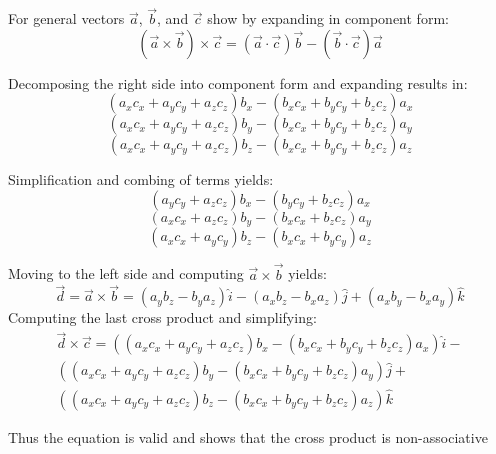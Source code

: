 For general vectors $\vec{a}$, $\vec{b}$, and $\vec{c}$ show by expanding in component form:
\begin{equation*}
	\left(\vec{a} \times \vec{b}\right) \times \vec{c}=\left(\vec{a}\cdot\vec{c}\right)\vec{b}-\left(\vec{b}\cdot\vec{c}\right)\vec{a}
\end{equation*}

Decomposing the right side into component form and expanding results in:
\begin{equation*}
\left(a_xc_x+a_yc_y+a_zc_z\right)b_x-\left(b_xc_x+b_yc_y+b_zc_z\right)a_x
\end{equation*}
\begin{equation*}
\left(a_xc_x+a_yc_y+a_zc_z\right)b_y-\left(b_xc_x+b_yc_y+b_zc_z\right)a_y
\end{equation*}
\begin{equation*}
\left(a_xc_x+a_yc_y+a_zc_z\right)b_z-\left(b_xc_x+b_yc_y+b_zc_z\right)a_z
\end{equation*}

Simplification and combing of terms yields:
\begin{equation*}
\left(a_yc_y+a_zc_z\right)b_x-\left(b_yc_y+b_zc_z\right)a_x
\end{equation*}
\begin{equation*}
\left(a_xc_x+a_zc_z\right)b_y-\left(b_xc_x+b_zc_z\right)a_y
\end{equation*}
\begin{equation*}
\left(a_xc_x+a_yc_y\right)b_z-\left(b_xc_x+b_yc_y\right)a_z
\end{equation*}

Moving to the left side and computing $\vec{a}\times \vec{b}$ yields:
\begin{equation*}
\vec{d}=\vec{a}\times\vec{b}=\left(a_yb_z-b_ya_z\right)\hat{i} -\left(a_xb_z-b_xa_z\right)\hat{j}+\left(a_xb_y-b_xa_y\right)\hat{k}
\end{equation*}
Computing the last cross product and simplifying:
\begin{align*}
\vec{d}\times\vec{c}=\left(\left(a_xc_x+a_yc_y+a_zc_z\right)b_x-\left(b_xc_x+b_yc_y+b_zc_z\right)a_x\right)\hat{i}- \\
\left(\left(a_xc_x+a_yc_y+a_zc_z\right)b_y-\left(b_xc_x+b_yc_y+b_zc_z\right)a_y\right)\hat{j}+\\\left(\left(a_xc_x+a_yc_y+a_zc_z\right)b_z-\left(b_xc_x+b_yc_y+b_zc_z\right)a_z\right)\hat{k}
\end{align*}

Thus the equation is valid and shows that the cross product is non-associative
